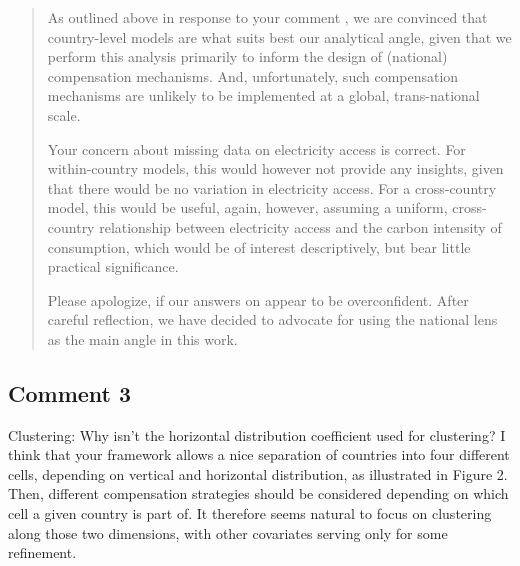 \documentclass[11pt]{article}
\newenvironment{response}
{\begin{quote}\color{black}}
{\end{quote}}
\begin{document}
\begin{response}
    As outlined above in response to your comment , we are convinced that country-level models are what suits best our analytical angle, given that we perform this analysis primarily to inform the design of (national) compensation mechanisms. And, unfortunately, such compensation mechanisms are unlikely to be implemented at a global, trans-national scale.

    Your concern about missing data on electricity access is correct. For within-country models, this would however not provide any insights, given that there would be no variation in electricity access. For a cross-country model, this would be useful, again, however, assuming a uniform, cross-country relationship between electricity access and the carbon intensity of consumption, which would be of interest descriptively, but bear little practical significance.

    Please apologize, if our answers on  appear to be overconfident. After careful reflection, we have decided to advocate for using the national lens as the main angle in this work.
\end{response}

\subsection*{Comment 3}\label{comment_R2_3}

\begin{commentbox}
    Clustering: Why isn’t the horizontal distribution coefficient used for clustering? I think that your framework allows a nice separation of countries into four different cells, depending on vertical and horizontal distribution, as illustrated in Figure 2. Then, different compensation strategies should be considered depending on which cell a given country is part of. It therefore seems natural to focus on clustering along those two dimensions, with other covariates serving only for some refinement.
\end{commentbox}
\end{document}
